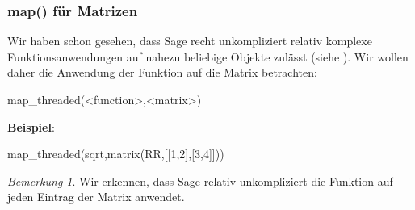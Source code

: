 \documentclass[fontsize=12pt,paper=a4,twoside,bibtotoc,idxtotoc,
liststotoc,pagesize,BCOR1.2cm,DIV15,chapterprefix,pagesize=pdftex]{scrbook}
\theoremstyle{plain}
\theoremstyle{definition}
\theoremstyle{remark}
\newtheorem{bem}[equation]{Bemerkung}
\begin{document}
\subsubsection{map() für Matrizen}
Wir haben schon gesehen, dass Sage recht unkompliziert relativ komplexe Funktionsanwendungen auf nahezu beliebige Objekte 
zulässt (siehe ). Wir wollen daher die Anwendung der Funktion  auf die Matrix  betrachten:
\begin{sagein}
map_threaded(<function>,<matrix>)
\end{sagein}
\textbf{Beispiel}:
\begin{sagein}
map_threaded(sqrt,matrix(RR,[[1,2],[3,4]]))
\end{sagein}
\begin{sage}
[1.00000000000000 1.41421356237310]
[1.73205080756888 2.00000000000000] 
\end{sage}
\begin{bem}
 Wir erkennen, dass Sage relativ unkompliziert die Funktion auf jeden Eintrag der Matrix anwendet.
\end{bem}
\end{document}
